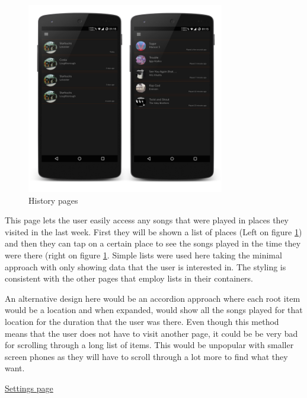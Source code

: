 \noindent
\begin{figure}[h!]
\centering
\includegraphics[width=0.77\textwidth]{./img/historyboth.png}
\caption{History pages}
\label{fig:historyboth}
\end{figure}

This page lets the user easily access any songs that were played in places they visited in the last week. First they will be shown a list of places (Left on figure \ref{fig:historyboth}) and then they can tap on a certain place to see the songs played in the time they were there (right on figure \ref{fig:historyboth}. Simple lists were used here taking the minimal approach with only showing data that the user is interested in. The styling is consistent with the other pages that employ lists in their containers.

An alternative design here would be an accordion approach where each root item would be a location and when expanded, would show all the songs played for that location for the duration that the user was there. Even though this method means that the user does not have to visit another page, it could be be very bad for scrolling through a long list of items. This would be unpopular with smaller screen phones as they will have to scroll through a lot more to find what they want.

\clearpage

\noindent\underline{Settings page}\newline


